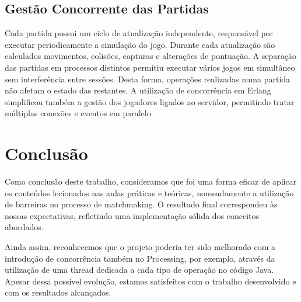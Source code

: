 \documentclass[11pt,a4paper]{article}
\begin{document}
\subsection{Gestão Concorrente das Partidas}
Cada partida possui um ciclo de atualização independente, responsável por executar periodicamente a simulação do jogo. Durante cada atualização são calculados movimentos, colisões, capturas e alterações de pontuação.
A separação das partidas em processos distintos permitiu executar vários jogos em simultâneo sem interferência entre sessões. Desta forma, operações realizadas numa partida não afetam o estado das restantes.
A utilização de concorrência em Erlang simplificou também a gestão dos jogadores ligados ao servidor, permitindo tratar múltiplas conexões e eventos em paralelo.


\newpage
\section{Conclusão}

Como conclusão deste trabalho, consideramos que foi uma forma eficaz de aplicar os conteúdos lecionados nas aulas práticas e teóricas, nomeadamente a utilização de barreiras no processo de matchmaking. O resultado final correspondeu às nossas expectativas, refletindo uma implementação sólida dos conceitos abordados.

Ainda assim, reconhecemos que o projeto poderia ter sido melhorado com a introdução de concorrência também no Processing, por exemplo, através da utilização de uma thread dedicada a cada tipo de operação no código Java. Apesar dessa possível evolução, estamos satisfeitos com o trabalho desenvolvido e com os resultados alcançados.
\end{document}
